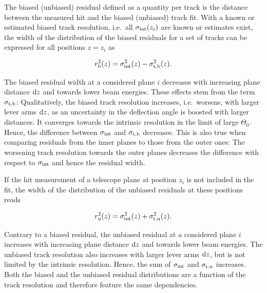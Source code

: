 The biased (unbiased) residual defined as a quantity per track is the distance between the measured hit and the biased (unbiased) track fit. 
With a known or estimated biased track resolution, i.e.\ all $\sigma_{\textrm{int}}(z_i)$ are known or estimates exist,
 the width of the distribution of the \textrm{biased} residuals for a set of tracks can be expressed for all positions $z = z_i$ as

\begin{equation}
 \label{eq:telescoperesolutionequation1}
 r_{\textrm{b}}^2(z) = \sigma_{\textrm{int}}^2(z) - \sigma_{\textrm{t,b}}^2(z).
\end{equation}

\noindent
The biased residual width at a considered plane $i$ decreases with increasing plane distance $\textrm{d}z$ and towards lower beam energies. 
These effects stem from the term $\sigma_{\textrm{t,b}}$: 
Qualitatively, the biased track resolution increases, i.e.\ worsens, with larger lever arms $\textrm{d}z$, as an uncertainty in the deflection angle is boosted with larger distances. 
It converges towards the intrinsic resolution in the limit of large $\Theta_0$. 
Hence, the difference between $\sigma_{\textrm{int}}$ and $\sigma_{\textrm{t,b}}$ decreases. 
This is also true when comparing residuals from the inner planes to those from the outer ones:
The worsening track resolution towards the outer planes decreases the difference with respect to $\sigma_{\textrm{int}}$ and hence the residual width. 

If the hit measurement of a telescope plane at position $z_i$ is not included in the fit,
 the width of the distribution of the \textrm{unbiased} residuals at these positions reads~\cite{ref:eudetreport200902}
 
\begin{equation}
r_{\textrm{u}}^2(z) = \sigma_{\textrm{int}}^2(z) + \sigma_{\textrm{t,u}}^2(z).
\label{eq:telescoperesolutionequation2} 
\end{equation}

\noindent
Contrary to a biased residual, the unbiased residual at a considered plane $i$ increases with increasing plane distance $\textrm{d}z$ and towards lower beam energies. 
The unbiased track resolution also increases with larger lever arms $\textrm{d}z$, but is not limited by the intrinsic resolution. 
Hence, the sum of $\sigma_{\textrm{int}}$ and $\sigma_{\textrm{t,u}}$ increases. 
Both the biased and the unbiased residual distributions are a function of the track resolution and therefore feature the same dependencies.

